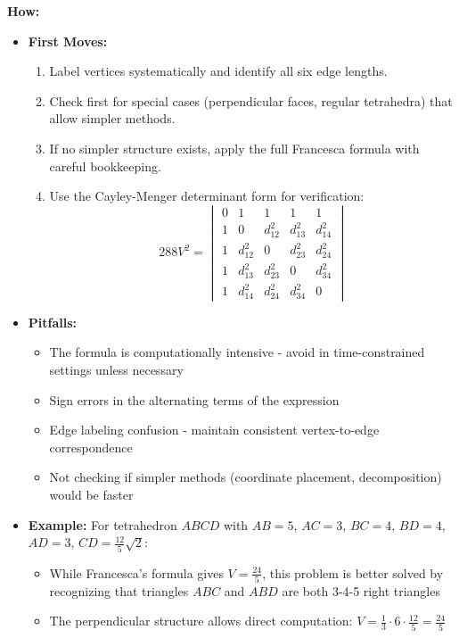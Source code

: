 \documentclass[12pt]{article}
\begin{document}
\textbf{How:}
\begin{itemize}
    \item \textbf{First Moves:} 
    \begin{enumerate}[nosep]
        \item Label vertices systematically and identify all six edge lengths.
        \item Check first for special cases (perpendicular faces, regular tetrahedra) that allow simpler methods.
        \item If no simpler structure exists, apply the full Francesca formula with careful bookkeeping.
        \item Use the Cayley-Menger determinant form for verification:
        \[
        288V^2 = \begin{vmatrix}
        0 & 1 & 1 & 1 & 1 \\
        1 & 0 & d_{12}^2 & d_{13}^2 & d_{14}^2 \\
        1 & d_{12}^2 & 0 & d_{23}^2 & d_{24}^2 \\
        1 & d_{13}^2 & d_{23}^2 & 0 & d_{34}^2 \\
        1 & d_{14}^2 & d_{24}^2 & d_{34}^2 & 0
        \end{vmatrix}
        \]
    \end{enumerate}
    \item \textbf{Pitfalls:} 
    \begin{itemize}[nosep]
        \item The formula is computationally intensive - avoid in time-constrained settings unless necessary
        \item Sign errors in the alternating terms of the expression
        \item Edge labeling confusion - maintain consistent vertex-to-edge correspondence
        \item Not checking if simpler methods (coordinate placement, decomposition) would be faster
    \end{itemize}
    \item \textbf{Example:} For tetrahedron $ABCD$ with $AB=5$, $AC=3$, $BC=4$, $BD=4$, $AD=3$, $CD=\frac{12}{5}\sqrt{2}$:
    \begin{itemize}[nosep]
        \item While Francesca's formula gives $V=\frac{24}{5}$, this problem is better solved by recognizing that triangles $ABC$ and $ABD$ are both 3-4-5 right triangles
        \item The perpendicular structure allows direct computation: $V = \frac{1}{3} \cdot 6 \cdot \frac{12}{5} = \frac{24}{5}$
    \end{itemize}
\end{itemize}
\end{document}
